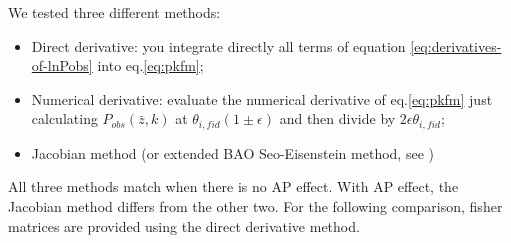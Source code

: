 We tested three different methods: 
\begin{itemize}
\item Direct derivative: you integrate directly all terms of equation \ref{eq:derivatives-of-lnPobs} into eq.\ref{eq:pkfm};
\item Numerical derivative: evaluate the numerical derivative of eq.\ref{eq:pkfm} just calculating $P_{obs}(\bar{z},k)$ at $\theta_{i, fid} (1\pm \epsilon)$ and then divide by $2\epsilon \theta_{i, fid}$;
\item Jacobian method (or extended BAO Seo-Eisenstein method, see \cite{2003ApJ...598..720S}) 
\end{itemize}
All three methods match when there is no AP effect. With AP effect, the Jacobian method differs from the other two. For the following comparison, fisher matrices are provided using the direct derivative method.

